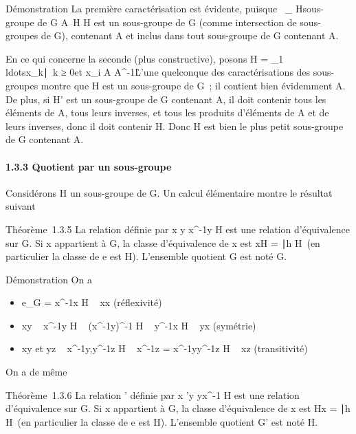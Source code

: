 \documentclass[]{article}
\begin{document}
Démonstration La première caractérisation est évidente, puisque
\⋂  ~\_
H\text sous-groupe de G \atop A\subset~H
H est un sous-groupe de G (comme intersection de sous-groupes de G),
contenant A et inclus dans tout sous-groupe de G contenant A.

En ce qui concerne la seconde (plus constructive), posons H =
\x\_1\\ldotsx\_k\mathrel∣~k
≥ 0\text et x\_i \in A \cup
A^-1\. L'une quelconque des caractérisations
des sous-groupes montre que H est un sous-groupe de G~; il contient bien
évidemment A. De plus, si H' est un sous-groupe de G contenant A, il
doit contenir tous les éléments de A, tous leurs inverses, et tous les
produits d'éléments de A et de leurs inverses, donc il doit contenir H.
Donc H est bien le plus petit sous-groupe de G contenant A.

\paragraph{1.3.3 Quotient par un sous-groupe}

Considérons H un sous-groupe de G. Un calcul élémentaire montre le
résultat suivant

Théorème~1.3.5 La relation  définie par x  y
\Leftrightarrow x^-1y \in H est une relation
d'équivalence sur G. Si x appartient à G, la classe d'équivalence de x
est xH = \xh∣h \in
H\ (en particulier la classe de e est H). L'ensemble
quotient G\diagup{} est noté G\diagupH.

Démonstration On a

\begin{itemize}
\itemsep1pt\parskip0pt
\item
  e\_G = x^-1x \in H \rigtharrow~ xx (réflexivité)
\item
  xy \rigtharrow~ x^-1y \in H \rigtharrow~ (x^-1y)^-1 \in H \rigtharrow~
  y^-1x \in H \rigtharrow~ yx (symétrie)
\item
  xy et yz \rigtharrow~ x^-1y,y^-1z \in H \rigtharrow~ x^-1z
  = x^-1yy^-1z \in H \rigtharrow~ xz (transitivité)
\end{itemize}

On a de même

Théorème~1.3.6 La relation ' définie par x 'y
\Leftrightarrow yx^-1 \in H est une relation
d'équivalence sur G. Si x appartient à G, la classe d'équivalence de x
est Hx = \hx∣h \in
H\ (en particulier la classe de e est H). L'ensemble
quotient G\diagup{}' est noté H\diagdownG.
\end{document}
